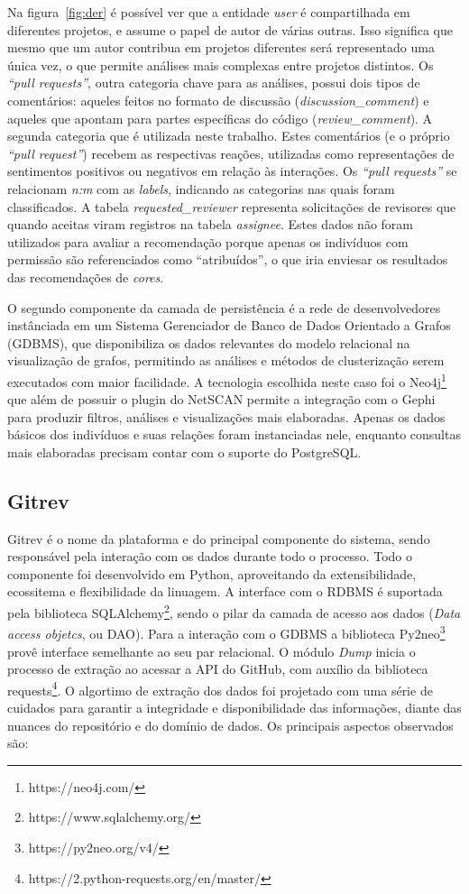 \documentclass[12pt,openany,oneside,a4paper,english,brazil]{abntbibufjf}
\begin{document}
    Na figura~\ref{fig:der} é possível ver que a entidade \textit{user} é compartilhada em diferentes projetos, e assume o papel de autor de várias outras. Isso significa que mesmo que um autor contribua em projetos diferentes será representado uma única vez, o que permite análises mais complexas entre projetos distintos. Os \textit{``pull requests''}, outra categoria chave para as análises, possui dois tipos de comentários: aqueles feitos no formato de discussão (\textit{discussion\_comment}) e aqueles que apontam para partes específicas do código (\textit{review\_comment}). A segunda categoria que é utilizada neste trabalho. Estes comentários (e o próprio \textit{``pull request''}) recebem as respectivas reações, utilizadas como representações de sentimentos positivos ou negativos em relação às interações. Os \textit{``pull requests''} se relacionam \textit{n:m} com as \textit{labels}, indicando as categorias nas quais foram classificados. A tabela \textit{requested\_reviewer} representa solicitações de revisores que quando aceitas viram registros na tabela \textit{assignee}. Estes dados não foram utilizados para avaliar a recomendação porque apenas os indivíduos com permissão são referenciados como ``atribuídos'', o que iria enviesar os resultados das recomendações de \textit{cores}.

    O segundo componente da camada de persistência é a rede de desenvolvedores instânciada em um Sistema Gerenciador de Banco de Dados Orientado a Grafos (GDBMS), que disponibiliza os dados relevantes do modelo relacional na visualização de grafos, permitindo as análises e métodos de clusterização serem executados com maior facilidade. A tecnologia escolhida neste caso foi o Neo4j\footnote{https://neo4j.com/} que além de possuir o plugin do NetSCAN permite a integração com o Gephi para produzir filtros, análises e visualizações mais elaboradas. Apenas os dados básicos dos indivíduos e suas relações foram instanciadas nele, enquanto consultas mais elaboradas precisam contar com o suporte do PostgreSQL.

    \subsection{Gitrev}

    Gitrev é o nome da plataforma e do principal componente do sistema, sendo responsável pela interação com os dados durante todo o processo. Todo o componente foi desenvolvido em Python, aproveitando da extensibilidade, ecossitema e flexibilidade da linuagem. A interface com o RDBMS é suportada pela biblioteca SQLAlchemy\footnote{https://www.sqlalchemy.org/}, sendo o pilar da camada de acesso aos dados (\textit{Data access objetcs}, ou DAO). Para a interação com o GDBMS a biblioteca Py2neo\footnote{https://py2neo.org/v4/} provê interface semelhante ao seu par relacional. O módulo \textit{Dump} inicia o processo de extração ao acessar a API do GitHub, com auxílio da biblioteca requests\footnote{https://2.python-requests.org/en/master/}. O algortimo de extração dos dados foi projetado com uma série de cuidados para garantir a integridade e disponibilidade das informações, diante das nuances do repositório e do domínio de dados. Os principais aspectos observados são:
\end{document}
